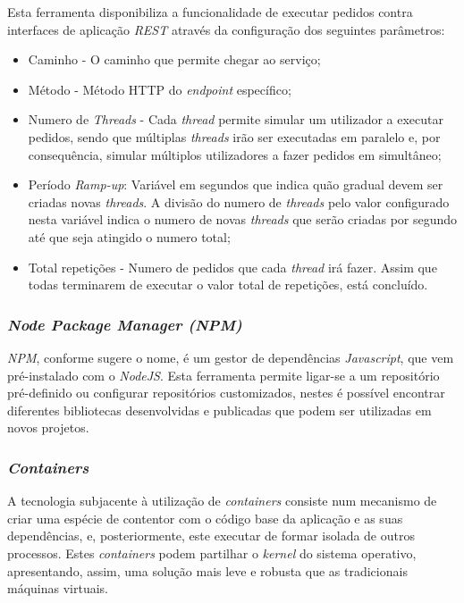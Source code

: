 Esta ferramenta disponibiliza a funcionalidade de executar pedidos contra interfaces de aplicação \emph{\acrshort{REST}} através da configuração dos seguintes parâmetros\cite{jmeter}:
\begin{itemize}
    \item Caminho - O caminho que permite chegar ao serviço;
    \item Método - Método HTTP do \emph{endpoint} específico;
    \item Numero de \emph{Threads} - Cada \emph{thread} permite simular um utilizador a executar pedidos, sendo que múltiplas \emph{threads} irão ser executadas em paralelo e, por consequência, simular múltiplos utilizadores a fazer pedidos em simultâneo;
    \item Período \emph{Ramp-up}: Variável em segundos que indica quão gradual devem ser criadas novas \emph{threads}. A divisão do numero de \emph{threads} pelo valor configurado nesta variável indica o numero de novas \emph{threads} que serão criadas por segundo até que seja atingido o numero total;
    \item Total repetições - Numero de pedidos que cada \emph{thread} irá fazer. Assim que todas terminarem de executar o valor total de repetições, está concluído.
\end{itemize}

\subsubsection*{\emph{Node Package Manager (NPM) \label{sym:npm}}\label{estado_arte_npm}}
\emph{NPM}, conforme sugere o nome, é um gestor de dependências \emph{Javascript}, que vem pré-instalado com o \emph{NodeJS}.
Esta ferramenta permite ligar-se a um repositório pré-definido ou configurar repositórios customizados, nestes é possível encontrar diferentes bibliotecas desenvolvidas e publicadas que podem ser utilizadas em novos projetos\cite{npm_explanation}.

\subsubsection*{\emph{Containers} \label{estado_arte_containers}}
A tecnologia subjacente à utilização de \emph{containers} consiste num mecanismo de criar uma espécie de contentor com o código base da aplicação e as suas dependências, e, posteriormente, este executar de formar isolada de outros processos.
Estes \emph{containers} podem partilhar o \emph{kernel} do sistema operativo, apresentando, assim, uma solução mais leve e robusta que as tradicionais máquinas virtuais\cite{techradar_containers}.

